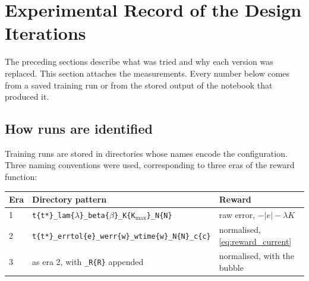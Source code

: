 %

\section{Experimental Record of the Design Iterations}
\label{sec:rl_record}

The preceding sections describe what was tried and why each version was
replaced. This section attaches the measurements. Every number below comes
from a saved training run or from the stored output of the notebook that
produced it.

\subsection{How runs are identified}
\label{sec:rl_record_naming}

Training runs are stored in directories whose names encode the configuration.
Three naming conventions were used, corresponding to three eras of the reward
function:

\begin{center}
\begin{tabular}{@{}lll@{}}
\toprule
Era & Directory pattern & Reward \\
\midrule
1 & \texttt{t\{t*\}\_lam\{$\lambda$\}\_beta\{$\beta$\}\_K\{K$_{\max}$\}\_N\{N\}}
  & raw error, $-|e| - \lambda K$ \\
2 & \texttt{t\{t*\}\_errtol\{e\}\_werr\{w\}\_wtime\{w\}\_N\{N\}\_c\{c\}}
  & normalised, \eqref{eq:reward_current} \\
3 & as era 2, with \texttt{\_R\{R\}} appended
  & normalised, with the bubble \\
\bottomrule
\end{tabular}
\end{center}

